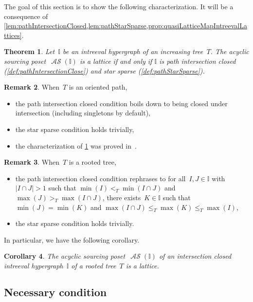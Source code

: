\documentclass{amsart}
\newtheorem{theorem}{Theorem}[section]
\newtheorem{corollary}[theorem]{Corollary}
\theoremstyle{definition}
\newtheorem{remark}[theorem]{Remark}
\DeclareMathOperator{\ASour}{\mathcal{AS}}  %
\newcommand{\II}{\mathbb I} %
\begin{document}
The goal of this section is to show the following characterization.
It will be a consequence of \cref{lem:pathIntersectionClosed,lem:pathStarSparse,prop:quasiLatticeMapIntreevalLattices}.

\begin{theorem}
\label{thm:intreevalLattices}
Let~$\II$ be an intreeval hypergraph of an increasing tree~$T$.
The acyclic sourcing poset~$\ASour(\II)$ is a lattice if and only if $\II$ is path intersection closed (\cref{def:pathIntersectionClose}) and star sparse (\cref{def:pathStarSparse}).
\end{theorem}

\begin{remark}
When~$T$ is an oriented path, 
\begin{itemize}
\item the path intersection closed condition boils down to being closed under intersection (including singletons by default),
\item the star sparse condition holds trivially,
\item the characterization of \cref{thm:intreevalLattices} was proved in~\cite[Thm.~A]{BergeronPilaud}.
\end{itemize}
\end{remark}

\pagebreak
\begin{remark}
When~$T$ is a rooted tree,
\begin{itemize}
\item the path intersection closed condition rephrases to for all~$I,J\in \II$ with~$|I\cap J|> 1$ such that $\min(I) <_T \min(I\cap J)$ and  $\max(J) >_T \max(I\cap J)$, there exists~$K \in \II$ such that $\min(J) = \min(K)$ and ${\max(I\cap J) \le_T \max(K) \le_T \max(I)}$,
\item the star sparse condition holds trivially.
\end{itemize}
In particular, we have the following corollary.
\end{remark}

\begin{corollary}
The acyclic sourcing poset~$\ASour(\II)$ of an intersection closed intreeval hypergraph~$\II$ of a rooted tree~$T$ is a lattice.
\end{corollary}


\subsection{Necessary condition}
\label{subsec:necessary}
\end{document}
